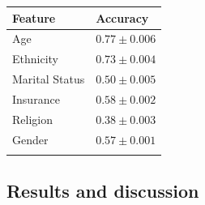 \documentclass{bioinfo}
\begin{document}
\begin{methods}
\begin{table}[!t]
{\begin{tabular}{@{}ll@{}}\toprule Feature &
Accuracy \\\midrule
Age & $0.77 \pm 0.006$\\
Ethnicity & $ 0.73 \pm 0.004 $\\
Marital Status & $ 0.50 \pm 0.005 $\\
Insurance & $ 0.58 \pm 0.002 $\\
Religion & $ 0.38 \pm 0.003 $\\
Gender & $ 0.57 \pm 0.001 $\\\botrule
\end{tabular}}{}
\end{table}


\end{methods}


\subsection{Results and discussion}
\label{sec:expresults}
\end{document}
